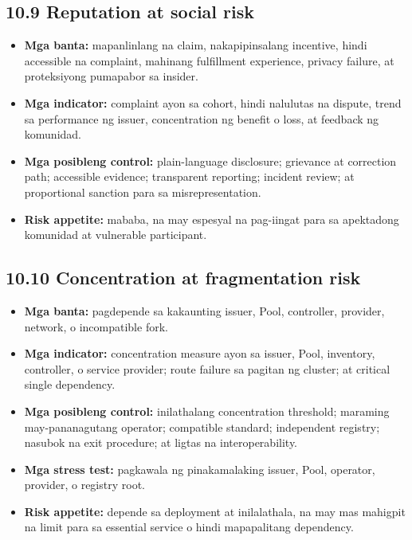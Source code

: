 \documentclass[11pt]{article}
\begin{document}
\subsection*{10.9 Reputation at social risk}

\begin{itemize}[leftmargin=*]
\item \textbf{Mga banta:} mapanlinlang na claim, nakapipinsalang incentive, hindi accessible na complaint, mahinang fulfillment experience, privacy failure, at proteksiyong pumapabor sa insider.
\item \textbf{Mga indicator:} complaint ayon sa cohort, hindi nalulutas na dispute, trend sa performance ng issuer, concentration ng benefit o loss, at feedback ng komunidad.
\item \textbf{Mga posibleng control:} plain-language disclosure; grievance at correction path; accessible evidence; transparent reporting; incident review; at proportional sanction para sa misrepresentation.
\item \textbf{Risk appetite:} mababa, na may espesyal na pag-iingat para sa apektadong komunidad at vulnerable participant.
\end{itemize}
\subsection*{10.10 Concentration at fragmentation risk}

\begin{itemize}[leftmargin=*]
\item \textbf{Mga banta:} pagdepende sa kakaunting issuer, Pool, controller, provider, network, o incompatible fork.
\item \textbf{Mga indicator:} concentration measure ayon sa issuer, Pool, inventory, controller, o service provider; route failure sa pagitan ng cluster; at critical single dependency.
\item \textbf{Mga posibleng control:} inilathalang concentration threshold; maraming may-pananagutang operator; compatible standard; independent registry; nasubok na exit procedure; at ligtas na interoperability.
\item \textbf{Mga stress test:} pagkawala ng pinakamalaking issuer, Pool, operator, provider, o registry root.
\item \textbf{Risk appetite:} depende sa deployment at inilalathala, na may mas mahigpit na limit para sa essential service o hindi mapapalitang dependency.
\end{itemize}
\end{document}

